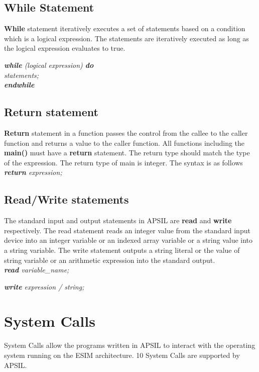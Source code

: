 \documentclass[11pt]{article}
\begin{document}
\subsection{While Statement}
\textbf{While} statement iteratively executes a set of statements based on a condition which is a logical expression.  The statements are iteratively executed as long as the logical expression evaluates to true.

\textit{
\textbf{while} (logical expression) \textbf{do}  \\
 \indent \indent statements; \\
\indent \textbf{endwhile}  \\
}





\subsection{Return statement}
\textbf{Return} statement in a function passes the control from the callee to the caller function and returns a value to the caller function. All functions including the \textbf{main()} must have a \textbf{return} statement. The return type should match the type of the expression. The return type of main is integer. The syntax is as follows\\

\textit{\textbf{return} expression;}


\subsection{Read/Write statements}
The standard input and output statements in APSIL are \textbf{read} and \textbf{write} respectively. The read statement reads an integer value from the standard input device into an integer variable or an indexed array variable or a string value into a string variable. The write statement outputs a string literal or the value of string variable or an arithmetic expression  into the standard output.\\

\textit{\textbf{read} variable\_name;}

\textit{\textbf{write} expression / string;}

\section{System Calls}

System Calls allow the programs written in APSIL to interact with the operating system running on the ESIM architecture. 10 System Calls are supported by APSIL. 
\end{document}
